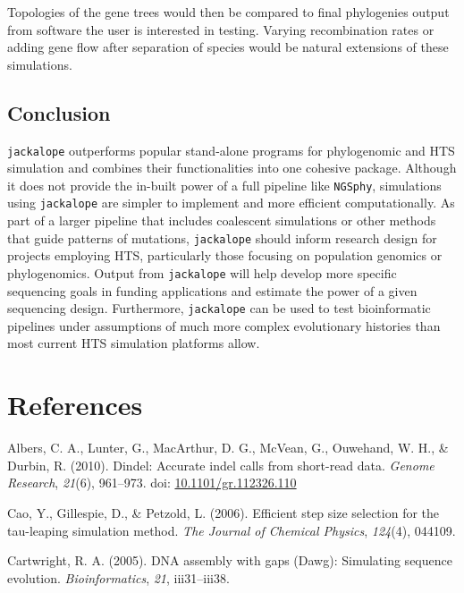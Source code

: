 \documentclass[12pt,]{article}
\begin{document}
Topologies of the gene trees would then be compared to final phylogenies output
from software the user is interested in testing.
Varying recombination rates or adding gene flow after separation of species would
be natural extensions of these simulations.

\hypertarget{conclusion}{%
\subsection{Conclusion}\label{conclusion}}

\texttt{jackalope} outperforms popular stand-alone programs for phylogenomic and HTS
simulation and combines their functionalities into one cohesive package.
Although it does not provide the in-built power of a full pipeline like \texttt{NGSphy},
simulations using \texttt{jackalope} are simpler to implement and more efficient computationally.
As part of a larger pipeline that includes coalescent simulations or other methods
that guide patterns of mutations, \texttt{jackalope} should inform research design for
projects employing HTS,
particularly those focusing on population genomics or phylogenomics.
Output from \texttt{jackalope} will help develop more specific sequencing goals
in funding applications and estimate the power of a given sequencing design.
Furthermore, \texttt{jackalope} can be used to test bioinformatic pipelines under
assumptions of much more complex evolutionary histories than most current HTS
simulation platforms allow.

\hypertarget{references}{%
\section{References}\label{references}}


\hypertarget{refs}{}
\leavevmode\hypertarget{ref-Albers_2010}{}%
Albers, C. A., Lunter, G., MacArthur, D. G., McVean, G., Ouwehand, W. H., \& Durbin, R. (2010). Dindel: Accurate indel calls from short-read data. \emph{Genome Research}, \emph{21}(6), 961--973. doi: \href{https://doi.org/10.1101/gr.112326.110}{10.1101/gr.112326.110}

\leavevmode\hypertarget{ref-Cao_2006}{}%
Cao, Y., Gillespie, D., \& Petzold, L. (2006). Efficient step size selection for the tau-leaping simulation method. \emph{The Journal of Chemical Physics}, \emph{124}(4), 044109.

\leavevmode\hypertarget{ref-Cartwright_2005}{}%
Cartwright, R. A. (2005). DNA assembly with gaps (Dawg): Simulating sequence evolution. \emph{Bioinformatics}, \emph{21}, iii31--iii38.
\end{document}
